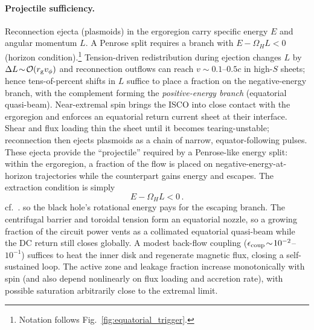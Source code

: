\documentclass[twocolumn]{aastex701}
\begin{document}
\paragraph{Projectile sufficiency.}
Reconnection ejecta (plasmoids) in the ergoregion carry specific energy $E$ and angular momentum $L$. A Penrose split requires a branch with $E-\Omega_H L<0$ (horizon condition).\footnote{Notation follows Fig.~\ref{fig:equatorial_trigger}.}
Tension-driven redistribution during ejection changes $L$ by $\Delta L\!\sim\!\mathcal{O}(r_{\rm g}v_\phi)$ and reconnection outflows can reach $v\!\sim\!0.1$--$0.5c$ in high-$S$ sheets; hence tens-of-percent shifts in $L$ suffice to place a fraction on the negative-energy branch, with the complement forming the \emph{positive-energy branch} (equatorial quasi-beam).
Near-extremal spin brings the ISCO into close contact with the ergoregion and enforces an equatorial return current sheet at their interface. Shear and flux loading thin the sheet until it becomes tearing-unstable; reconnection then ejects plasmoids as a chain of narrow, equator-following pulses. These ejecta provide the “projectile” required by a Penrose-like energy split: within the ergoregion, a fraction of the flow is placed on negative-energy-at-horizon trajectories while the counterpart gains energy and escapes. The extraction condition is simply
\begin{equation}
E - \Omega_H L < 0 \, .
\label{eq:penrose-cond}
\end{equation}
\noindent cf.\ \citealt{Penrose1969,Penrose2002}.
so the black hole’s rotational energy pays for the escaping branch. The centrifugal barrier and toroidal tension form an equatorial nozzle, so a growing fraction of the circuit power vents as a collimated equatorial quasi-beam while the DC return still closes globally. A modest back-flow coupling ($\epsilon_{\rm coup}\!\sim\!10^{-2}$--$10^{-1}$) suffices to heat the inner disk and regenerate magnetic flux, closing a self-sustained loop. The active zone and leakage fraction increase monotonically with spin (and also depend nonlinearly on flux loading and accretion rate), with possible saturation arbitrarily close to the extremal limit.
\end{document}
